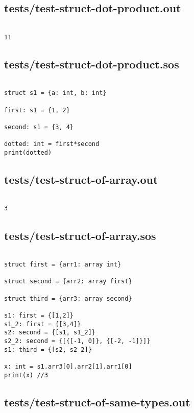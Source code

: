 \documentclass[main.tex]{subfiles}
\begin{document}
\subsection{tests/test-struct-dot-product.out}

\begin{lstlisting}

11
\end{lstlisting}

\subsection{tests/test-struct-dot-product.sos}

\begin{lstlisting}

struct s1 = {a: int, b: int}

first: s1 = {1, 2}

second: s1 = {3, 4}

dotted: int = first*second
print(dotted)
\end{lstlisting}

\subsection{tests/test-struct-of-array.out}

\begin{lstlisting}

3
\end{lstlisting}

\subsection{tests/test-struct-of-array.sos}

\begin{lstlisting}

struct first = {arr1: array int}

struct second = {arr2: array first}

struct third = {arr3: array second}

s1: first = {[1,2]}
s1_2: first = {[3,4]}
s2: second = {[s1, s1_2]}
s2_2: second = {[{[-1, 0]}, {[-2, -1]}]}
s1: third = {[s2, s2_2]}

x: int = s1.arr3[0].arr2[1].arr1[0]
print(x) //3
\end{lstlisting}

\subsection{tests/test-struct-of-same-types.out}
\end{document}
